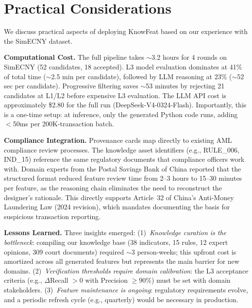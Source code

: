 \section{Practical Considerations}
\label{sec:practical}

We discuss practical aspects of deploying KnowFeat based on our experience with the SimECNY dataset.

\textbf{Computational Cost.}
The full pipeline takes $\sim$3.2 hours for 4 rounds on SimECNY (52 candidates, 18 accepted). L3 model evaluation dominates at 41\% of total time ($\sim$2.5 min per candidate), followed by LLM reasoning at 23\% ($\sim$52 sec per candidate). Progressive filtering saves $\sim$53 minutes by rejecting 21 candidates at L1/L2 before expensive L3 evaluation. The LLM API cost is approximately \$2.80 for the full run (DeepSeek-V4-0324-Flash). Importantly, this is a one-time setup: at inference, only the generated Python code runs, adding $<$50ms per 200K-transaction batch.

\textbf{Compliance Integration.}
Provenance cards map directly to existing AML compliance review processes. The knowledge asset identifiers (e.g., RULE\_006, IND\_15) reference the same regulatory documents that compliance officers work with. Domain experts from the Postal Savings Bank of China reported that the structured format reduced feature review time from 2--3 hours to 15--30 minutes per feature, as the reasoning chain eliminates the need to reconstruct the designer's rationale. This directly supports Article~32 of China's Anti-Money Laundering Law (2024 revision), which mandates documenting the basis for suspicious transaction reporting.

\textbf{Lessons Learned.}
Three insights emerged: (1)~\emph{Knowledge curation is the bottleneck}: compiling our knowledge base (38 indicators, 15 rules, 12 expert opinions, 309 court documents) required $\sim$3 person-weeks; this upfront cost is amortized across all generated features but represents the main barrier for new domains. (2)~\emph{Verification thresholds require domain calibration}: the L3 acceptance criteria (e.g., $\Delta$Recall $> 0$ with Precision $\geq 90\%$) must be set with domain stakeholders. (3)~\emph{Feature maintenance is ongoing}: regulatory requirements evolve, and a periodic refresh cycle (e.g., quarterly) would be necessary in production.
